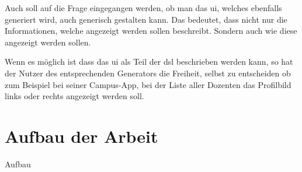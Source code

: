 Auch soll auf die Frage eingegangen werden, ob man das \ac{ui}, welches ebenfalls generiert wird, auch generisch gestalten kann. Das bedeutet, dass nicht nur die Informationen, welche angezeigt werden sollen beschreibt. Sondern auch wie diese angezeigt werden sollen.

Wenn es möglich ist dass das \ac{ui} als Teil der \ac{dsl} beschrieben werden kann, so hat der Nutzer des entsprechenden Generators die Freiheit, selbst zu entscheiden ob zum Beispiel bei seiner Campus-App, bei der Liste aller Dozenten das Profilbild links oder rechts angezeigt werden soll.

\section{Aufbau der Arbeit}\label{sec:structure}
Aufbau